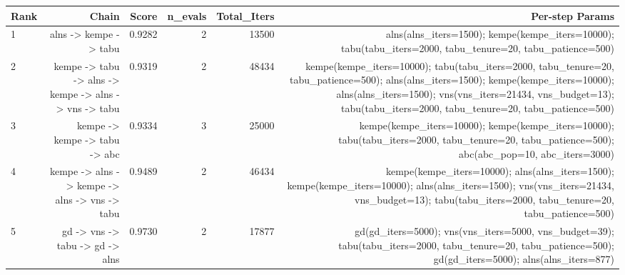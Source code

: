 \begin{tabular}{lrrrrr}
\toprule
Rank & Chain & Score & n\_evals & Total\_Iters & Per-step Params \\
\midrule
1 & alns -> kempe -> tabu & 0.9282 & 2 & 13500 & alns(alns\_iters=1500); kempe(kempe\_iters=10000); tabu(tabu\_iters=2000, tabu\_tenure=20, tabu\_patience=500) \\
2 & kempe -> tabu -> alns -> kempe -> alns -> vns -> tabu & 0.9319 & 2 & 48434 & kempe(kempe\_iters=10000); tabu(tabu\_iters=2000, tabu\_tenure=20, tabu\_patience=500); alns(alns\_iters=1500); kempe(kempe\_iters=10000); alns(alns\_iters=1500); vns(vns\_iters=21434, vns\_budget=13); tabu(tabu\_iters=2000, tabu\_tenure=20, tabu\_patience=500) \\
3 & kempe -> kempe -> tabu -> abc & 0.9334 & 3 & 25000 & kempe(kempe\_iters=10000); kempe(kempe\_iters=10000); tabu(tabu\_iters=2000, tabu\_tenure=20, tabu\_patience=500); abc(abc\_pop=10, abc\_iters=3000) \\
4 & kempe -> alns -> kempe -> alns -> vns -> tabu & 0.9489 & 2 & 46434 & kempe(kempe\_iters=10000); alns(alns\_iters=1500); kempe(kempe\_iters=10000); alns(alns\_iters=1500); vns(vns\_iters=21434, vns\_budget=13); tabu(tabu\_iters=2000, tabu\_tenure=20, tabu\_patience=500) \\
5 & gd -> vns -> tabu -> gd -> alns & 0.9730 & 2 & 17877 & gd(gd\_iters=5000); vns(vns\_iters=5000, vns\_budget=39); tabu(tabu\_iters=2000, tabu\_tenure=20, tabu\_patience=500); gd(gd\_iters=5000); alns(alns\_iters=877) \\
\bottomrule
\end{tabular}
